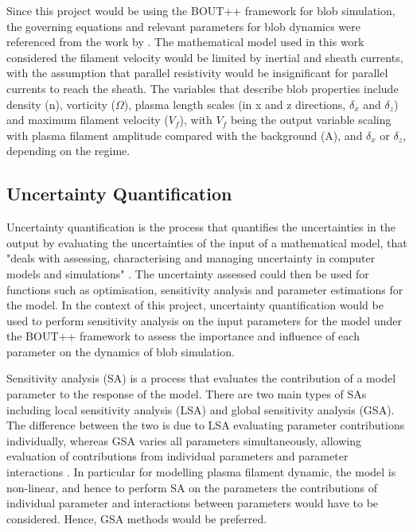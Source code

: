\documentclass{article}
\begin{document}
Since this project would be using the BOUT++ framework \cite{dudson_bout_2009} for blob simulation, the governing equations and relevant parameters for blob dynamics were referenced from the work by \cite{omotani_effects_2015}. The mathematical model used in this work considered the filament velocity would be limited by inertial and sheath currents, with the assumption that parallel resistivity would be insignificant for parallel currents to reach the sheath. The variables that describe blob properties include density (n), vorticity ($\Omega$), plasma length scales (in x and z directions, $\delta_x$ and $\delta_z$) and maximum filament velocity ($V_f$), with $V_f$ being the output variable scaling with plasma filament amplitude compared with the background (A), and $\delta_x$ or $\delta_z$, depending on the regime.  

\subsection*{Uncertainty Quantification}
Uncertainty quantification is the process that quantifies the uncertainties in the output by evaluating the uncertainties of the input of a mathematical model, that "deals with assessing, characterising and managing uncertainty in computer models and simulations" \cite{wu_chapter_2024,li_gaussian_2025}. The uncertainty assessed could then be used for functions such as optimisation, sensitivity analysis and parameter estimations for the model. In the context of this project, uncertainty quantification would be used to perform sensitivity analysis on the input parameters for the model under the BOUT++ framework to assess the importance and influence of each parameter on the dynamics of blob simulation.

Sensitivity analysis (SA) is a process that evaluates the contribution of a model parameter to the response of the model. There are two main types of SAs including local sensitivity analysis (LSA) and global sensitivity analysis (GSA). The difference between the two is due to LSA evaluating parameter contributions individually, whereas GSA varies all parameters simultaneously, allowing evaluation of contributions from individual parameters and parameter interactions \cite{tosin_tutorial_2020, zhang_sobol_2015}. In particular for modelling plasma filament dynamic, the model is non-linear, and hence to perform SA on the parameters the contributions of individual parameter and interactions between parameters would have to be considered. Hence, GSA methods would be preferred. 
\end{document}
